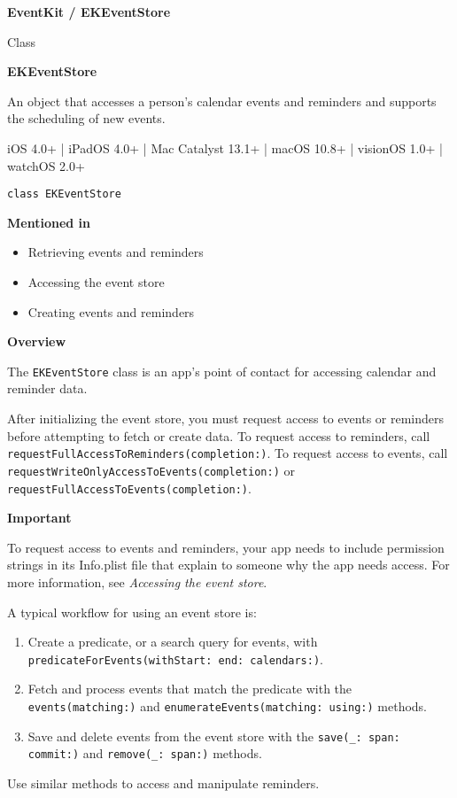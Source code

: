 \documentclass{article}
\title{}
\author{}
\date{}
\begin{document}
\textbf{EventKit / EKEventStore}

Class

\textbf{EKEventStore}

An object that accesses a person's calendar events and reminders and supports the scheduling of new events.

iOS 4.0+ | iPadOS 4.0+ | Mac Catalyst 13.1+ | macOS 10.8+ | visionOS 1.0+ | watchOS 2.0+

\texttt{class EKEventStore}

\textbf{Mentioned in}
\begin{itemize}
    \item Retrieving events and reminders
    \item Accessing the event store
    \item Creating events and reminders
\end{itemize}

\textbf{Overview}

The \texttt{EKEventStore} class is an app's point of contact for accessing calendar and reminder data.

After initializing the event store, you must request access to events or reminders before attempting to fetch or create data. To request access to reminders, call \texttt{requestFullAccessToReminders(completion:)}. To request access to events, call \texttt{requestWriteOnlyAccessToEvents(completion:)} or \texttt{requestFullAccessToEvents(completion:)}.

\textbf{Important}

To request access to events and reminders, your app needs to include permission strings in its Info.plist file that explain to someone why the app needs access. For more information, see \textit{Accessing the event store}.

A typical workflow for using an event store is:
\begin{enumerate}
    \item Create a predicate, or a search query for events, with \texttt{predicateForEvents(withStart: end: calendars:)}.
    \item Fetch and process events that match the predicate with the \texttt{events(matching:)} and \texttt{enumerateEvents(matching: using:)} methods.
    \item Save and delete events from the event store with the \texttt{save(_: span: commit:)} and \texttt{remove(_: span:)} methods.
\end{enumerate}

Use similar methods to access and manipulate reminders.
\end{document}
